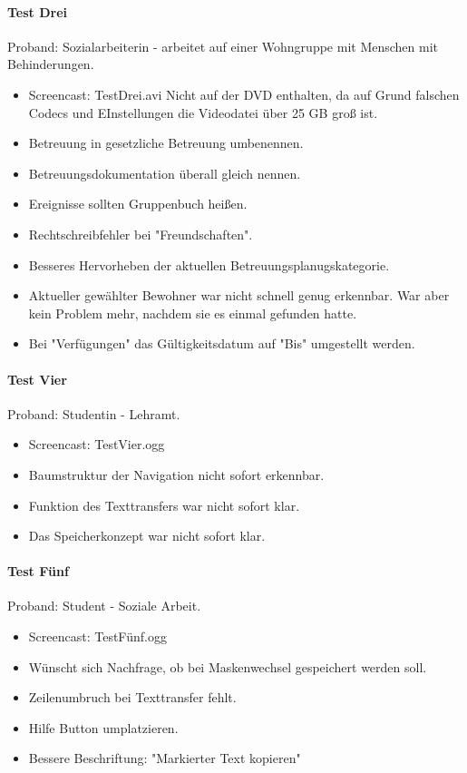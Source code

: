 \paragraph*{Test Drei}
Proband: Sozialarbeiterin - arbeitet auf einer Wohngruppe mit Menschen mit Behinderungen. 
\begin{itemize}
	\item Screencast: Test\textunderscore Drei.avi Nicht auf der DVD enthalten, da auf Grund falschen Codecs und EInstellungen die Videodatei über
25 GB groß ist.
	\item Betreuung in gesetzliche Betreuung umbenennen. 
	\item Betreuungsdokumentation überall gleich nennen.
	\item Ereignisse sollten Gruppenbuch heißen.
	\item Rechtschreibfehler bei "Freundschaften".
	\item Besseres Hervorheben der aktuellen Betreuungsplanugskategorie.
	\item Aktueller gewählter Bewohner war nicht schnell genug erkennbar. War aber kein Problem mehr, nachdem sie es einmal gefunden hatte.
	\item Bei "Verfügungen" das Gültigkeitsdatum auf "Bis" umgestellt werden.
\end{itemize}

\paragraph*{Test Vier}
Proband: Studentin - Lehramt.
\begin{itemize}
	\item Screencast: Test\textunderscore Vier.ogg
	\item Baumstruktur der Navigation nicht sofort erkennbar.
	\item Funktion des Texttransfers war nicht sofort klar.
	\item Das Speicherkonzept war nicht sofort klar.
\end{itemize}

\paragraph*{Test Fünf}
Proband: Student - Soziale Arbeit. 
\begin{itemize}
	\item Screencast: Test\textunderscore Fünf.ogg
	\item Wünscht sich Nachfrage, ob bei Maskenwechsel gespeichert werden soll. 
	\item Zeilenumbruch bei Texttransfer fehlt. 
	\item Hilfe Button umplatzieren.
	\item Bessere Beschriftung: "Markierter Text kopieren"
\end{itemize}

